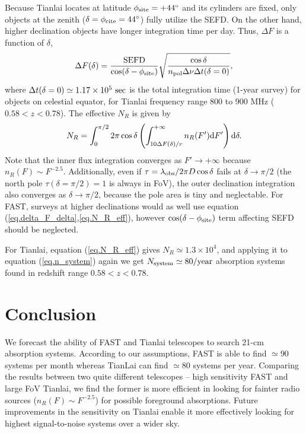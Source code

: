 \documentclass[]{raa}
\newcommand{\diff}{{\rm d}}
\begin{document}
Because Tianlai locates at latitude
$\phi_{\rm site}=+44^\circ$ and its cylinders are fixed, only
objects at the zenith ($\delta=\phi_{\rm cite}=44^\circ$) fully utilize
the SEFD. On the other hand, higher declination objects
have longer integration time per day. Thus, $\Delta F$ is
a function of $\delta$, 
\begin{equation}\label{eq.delta_F_delta}
    \Delta F(\delta) = \frac{\rm SEFD}{\cos(\delta-\phi_{\rm site})}
    {\sqrt{\frac{\cos\delta}{n_{\rm pol}\Delta\nu\Delta t(\delta=0)}}},
\end{equation}
where $\Delta t(\delta=0)\simeq 1.17\times 10^5\ {\rm sec}$ is the
total integration time (1-year survey) for objects on celestial equator,
for Tianlai frequency range 800 to 900 MHz ($0.58<z<0.78$).
The effective $N_R$ is given by
\begin{equation}\label{eq.N_R_eff}
    N_R=\int_0^{\pi/2}2\pi\cos\delta
    \left(\int_{10\Delta F(\delta)/r}^{+\infty}
    n_R(F')\diff F'\right)
    \diff\delta.
\end{equation}
Note that the inner flux integration converges as
$F'\rightarrow+\infty$ because $n_R(F)\sim F^{-2.5}$.
Additionally, even if $\tau=\lambda_{\rm obs}/2\pi D\cos\delta$
fails at $\delta\rightarrow\pi/2$ (the north pole
$\tau(\delta=\pi/2)=1$ is always in FoV),
the outer declination integration also converges
as $\delta\rightarrow\pi/2$, because the pole area is
tiny and neglectable.
For FAST, surveys at higher declinations would as well
use equation (\ref{eq.delta_F_delta},\ref{eq.N_R_eff}),
however $\cos(\delta-\phi_{\rm site})$ term affecting
SEFD should be neglected.

For Tianlai, equation (\ref{eq.N_R_eff}) gives $N_R\simeq 1.3\times 10^4$,
and applying it to equation (\ref{eq.n_system}) again
we get $N_{\rm system}\simeq 80 {\rm /year}$ absorption
systems found in redshift range $0.58<z<0.78$.


\section{Conclusion}\label{sec.conclusion}
We forecast the ability of FAST and Tianlai telescopes to search 21-cm
absorption systems. According to our assumptions, FAST is able
to find $\simeq 90$ systems per month
whereas TianLai can find $\simeq 80$ systems per year.
Comparing the results between two quite different telescopes --
high sensitivity FAST and large FoV Tianlai, we find the former is
more efficient in looking for fainter radio sources
($n_R(F)\sim F^{-2.5}$) for possible foreground absorptions.
Future improvements in the sensitivity on Tianlai enable it
more effectively looking for highest signal-to-noise systems
over a wider sky.
\end{document}
